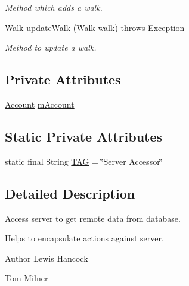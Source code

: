 \begin{DoxyCompactItemize}
\begin{DoxyCompactList}\small\item\em Method which adds a walk. \end{DoxyCompactList}\item 
\hyperlink{classuk_1_1ac_1_1swan_1_1digitaltrails_1_1components_1_1_walk}{Walk} \hyperlink{classuk_1_1ac_1_1swan_1_1digitaltrails_1_1sync_1_1_white_rock_server_accessor_a56a1925a9167eadbf22ab9dcc4526c7a}{update\+Walk} (\hyperlink{classuk_1_1ac_1_1swan_1_1digitaltrails_1_1components_1_1_walk}{Walk} walk)  throws Exception 
\begin{DoxyCompactList}\small\item\em Method to update a walk. \end{DoxyCompactList}\end{DoxyCompactItemize}
\subsection*{Private Attributes}
\begin{DoxyCompactItemize}
\item 
\hyperlink{classuk_1_1ac_1_1swan_1_1digitaltrails_1_1components_1_1_account}{Account} \hyperlink{classuk_1_1ac_1_1swan_1_1digitaltrails_1_1sync_1_1_white_rock_server_accessor_ae964c27059bf80e204342e1c528fbec0}{m\+Account}
\end{DoxyCompactItemize}
\subsection*{Static Private Attributes}
\begin{DoxyCompactItemize}
\item 
static final String \hyperlink{classuk_1_1ac_1_1swan_1_1digitaltrails_1_1sync_1_1_white_rock_server_accessor_a76a170f7051ecf2953fdd8951f893dab}{T\+A\+G} = \char`\"{}Server Accessor\char`\"{}
\end{DoxyCompactItemize}


\subsection{Detailed Description}
Access server to get remote data from database. 

Helps to encapsulate actions against server. \begin{DoxyAuthor}{Author}
Lewis Hancock 

Tom Milner 
\end{DoxyAuthor}


